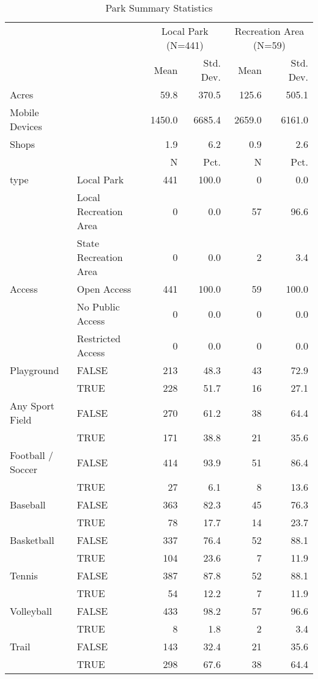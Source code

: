 \documentclass[3p, authoryear, review]{elsarticle} %
\begin{document}
\begin{table}

\caption{\label{tab:parkstable}Park Summary Statistics}
\centering
\begin{tabular}[t]{llrrrr}
\toprule
\multicolumn{2}{c}{ } & \multicolumn{2}{c}{Local Park (N=441)} & \multicolumn{2}{c}{Recreation Area (N=59)} \\
\cmidrule(l{3pt}r{3pt}){3-4} \cmidrule(l{3pt}r{3pt}){5-6}
  &    & Mean & Std. Dev. & Mean  & Std. Dev. \\
\midrule
Acres &  & 59.8 & 370.5 & 125.6 & 505.1\\
Mobile Devices &  & 1450.0 & 6685.4 & 2659.0 & 6161.0\\
Shops &  & 1.9 & 6.2 & 0.9 & 2.6\\
\midrule
 &  & N & Pct. & N & Pct.\\
type & Local Park & 441 & 100.0 & 0 & 0.0\\
 & Local Recreation Area & 0 & 0.0 & 57 & 96.6\\
 & State Recreation Area & 0 & 0.0 & 2 & 3.4\\
Access & Open Access & 441 & 100.0 & 59 & 100.0\\
 & No Public Access & 0 & 0.0 & 0 & 0.0\\
 & Restricted Access & 0 & 0.0 & 0 & 0.0\\
Playground & FALSE & 213 & 48.3 & 43 & 72.9\\
 & TRUE & 228 & 51.7 & 16 & 27.1\\
Any Sport Field & FALSE & 270 & 61.2 & 38 & 64.4\\
 & TRUE & 171 & 38.8 & 21 & 35.6\\
Football / Soccer & FALSE & 414 & 93.9 & 51 & 86.4\\
 & TRUE & 27 & 6.1 & 8 & 13.6\\
Baseball & FALSE & 363 & 82.3 & 45 & 76.3\\
 & TRUE & 78 & 17.7 & 14 & 23.7\\
Basketball & FALSE & 337 & 76.4 & 52 & 88.1\\
 & TRUE & 104 & 23.6 & 7 & 11.9\\
Tennis & FALSE & 387 & 87.8 & 52 & 88.1\\
 & TRUE & 54 & 12.2 & 7 & 11.9\\
Volleyball & FALSE & 433 & 98.2 & 57 & 96.6\\
 & TRUE & 8 & 1.8 & 2 & 3.4\\
Trail & FALSE & 143 & 32.4 & 21 & 35.6\\
 & TRUE & 298 & 67.6 & 38 & 64.4\\
\bottomrule
\end{tabular}
\end{table}
\end{document}
